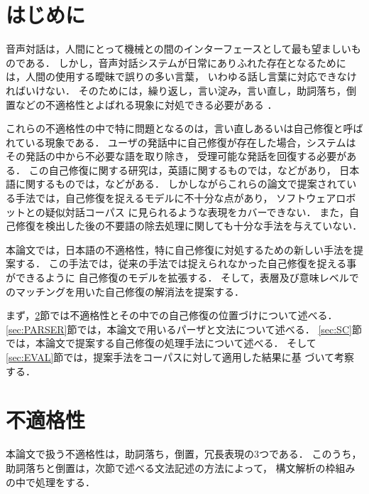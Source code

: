 \maketitle
\thispagestyle{empty}


\section{はじめに}\label{sec:INTRO}
音声対話は，人間にとって機械との間のインターフェースとして最も望ましいものである．
しかし，音声対話システムが日常にありふれた存在となるためには，人間の使用する曖昧で誤りの多い言葉，
いわゆる話し言葉に対応できなければいけない．
そのためには，繰り返し，言い淀み，言い直し，助詞落ち，倒置などの不適格性とよばれる現象に対処できる必要がある
\cite{YM1992,DY1997}．

これらの不適格性の中で特に問題となるのは，言い直しあるいは自己修復と呼ばれている現象である．
ユーザの発話中に自己修復が存在した場合，システムはその発話の中から不必要な語を取り除き，
受理可能な発話を回復する必要がある．
この自己修復に関する研究は，英語に関するものでは，\cite{HD1983,BJ1992,OD1992,NC1993,HP1997,CM1999}などがあり，
日本語に関するものでは，\cite{SY1994,KG1994,IM1996,DY1997,NM1998,HP1999}などがある．
しかしながらこれらの論文で提案されている手法では，自己修復を捉えるモデルに不十分な点があり，
ソフトウェアロボットとの疑似対話コーパス\cite{QDC}
に見られるような表現をカバーできない．
また，自己修復を検出した後の不要語の除去処理に関しても十分な手法を与えていない．

本論文では，日本語の不適格性，特に自己修復に対処するための新しい手法を提案する．
この手法では，従来の手法では捉えられなかった自己修復を捉える事ができるように
自己修復のモデルを拡張する．
そして，表層及び意味レベルでのマッチングを用いた自己修復の解消法を提案する．

まず，\ref{sec:ILL_FORMEDNESS}節では不適格性とその中での自己修復の位置づけについて述べる．
\ref{sec:PARSER}節では，本論文で用いるパーザと文法について述べる．
\ref{sec:SC}節では，本論文で提案する自己修復の処理手法について述べる．
そして\ref{sec:EVAL}節では，提案手法をコーパスに対して適用した結果に基
づいて考察する．


\section{不適格性}\label{sec:ILL_FORMEDNESS}
本論文で扱う不適格性は，助詞落ち，倒置，冗長表現の3つである．
このうち，助詞落ちと倒置は，次節で述べる文法記述の方法によって，
構文解析の枠組みの中で処理をする．

